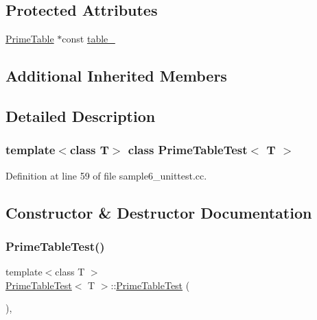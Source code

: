 \subsection*{Protected Attributes}
\begin{DoxyCompactItemize}
\item 
\hyperlink{classPrimeTable}{Prime\+Table} $\ast$const \hyperlink{classPrimeTableTest_a86da90fc6d5cef6386d0cd8fb52b4046}{table\+\_\+}
\end{DoxyCompactItemize}
\subsection*{Additional Inherited Members}


\subsection{Detailed Description}
\subsubsection*{template$<$class T$>$\newline
class Prime\+Table\+Test$<$ T $>$}



Definition at line 59 of file sample6\+\_\+unittest.\+cc.



\subsection{Constructor \& Destructor Documentation}
\mbox{\label{classPrimeTableTest_ab83d0b24b41bff1ace55f9a8d5ea6dcf}} 
\subsubsection{\texorpdfstring{Prime\+Table\+Test()}{PrimeTableTest()}}
{\footnotesize\ttfamily template$<$class T $>$ \\
\hyperlink{classPrimeTableTest}{Prime\+Table\+Test}$<$ T $>$\+::\hyperlink{classPrimeTableTest}{Prime\+Table\+Test} (\begin{DoxyParamCaption}{ }\end{DoxyParamCaption})\hspace{0.3cm}{\ttfamily [inline]}, {\ttfamily [protected]}}



